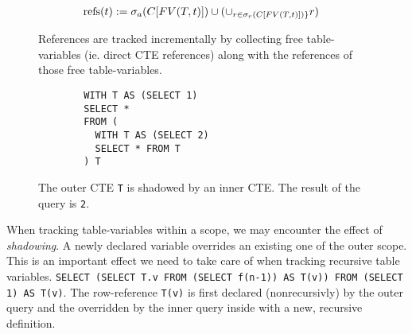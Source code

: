 \begin{align*}
    \operatorname{\text{refs}}(t) &:= \sigma_a(C[FV(T, t)]) \cup (\cup_{r \in \sigma_r(C[FV(T, t)])\}} r)
\end{align*}

\begin{figure}[h]
    \centering
    \caption{References are tracked incrementally by collecting free table-variables (ie. direct CTE references) along with the references of those free table-variables.}
    \label{fig:my_label}
\end{figure}


\begin{wrapfigure}{r}{0.5\textwidth}
    \begin{verbatim}
        WITH T AS (SELECT 1)
        SELECT *
        FROM (
          WITH T AS (SELECT 2)
          SELECT * FROM T
        ) T
    \end{verbatim}
    \caption{The outer CTE \texttt{T} is shadowed by an inner CTE. The result of the query is \texttt{2}.}
    \label{lst:indirect_callsite_ref}
\end{wrapfigure}
When tracking table-variables within a scope, we may encounter the effect of \textit{shadowing}. A newly declared variable overrides an existing one of the outer scope. This is an important effect we need to take care of when tracking recursive table variables. \texttt{SELECT (SELECT T.v FROM (SELECT f(n-1)) AS T(v)) FROM (SELECT 1) AS T(v)}. The row-reference \texttt{T(v)} is first declared (nonrecursivly) by the outer query and the overridden by the inner query inside \SELECT with a new, recursive definition.


